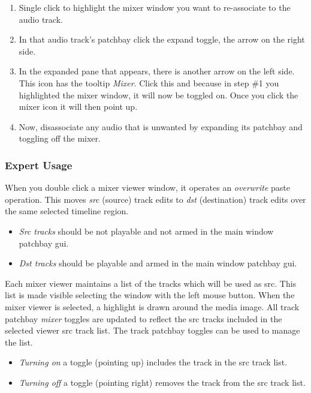 \begin{enumerate}
	\item Single click to highlight the mixer window you want to re-associate to the audio track.
	\item In that audio track’s patchbay click the expand toggle, the arrow on the right side.
	\item In the expanded pane that appears, there is another arrow on the left side.  This icon has the tooltip \textit{Mixer}.  Click this and because in step \#1 you highlighted the mixer window, it will now be toggled on.  Once you click the mixer icon it will then point up.
	\item Now, disassociate any audio that is unwanted by expanding its patchbay and toggling off the mixer.
\end{enumerate}

\subsubsection*{Expert Usage}%
\label{ssub:expert_usage}

When you double click a mixer viewer window, it operates an \textit{overwrite} paste operation.  This moves \textit{src} (source) track edits to \textit{dst} (destination) track edits over the same selected timeline region.

\begin{itemize}[noitemsep]
	\item \textit{Src tracks} should be not playable and not armed in the main window patchbay gui.
	\item \textit{Dst tracks} should be playable and armed in the main window patchbay gui.
\end{itemize}

Each mixer viewer maintains a list of the tracks which will be used as src. This list is made visible selecting the window with the left mouse button.  When the mixer viewer is selected, a highlight is drawn around the media image.  All track patchbay \textit{mixer} toggles are updated to reflect the src tracks included in the selected viewer src track list. The track patchbay toggles can be used to manage the list.

\begin{itemize}[noitemsep]
	\item \textit{Turning on} a toggle (pointing up) includes the track in the src track list.
	\item \textit{Turning off} a toggle (pointing right) removes the track from the src track list.
\end{itemize}

